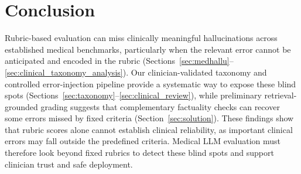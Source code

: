 \documentclass{article}
\begin{document}

\section{Conclusion}

Rubric-based evaluation can miss clinically meaningful hallucinations across established medical benchmarks, particularly when the relevant error cannot be anticipated and encoded in the rubric (Sections~\ref{sec:medhallu}--\ref{sec:clinical_taxonomy_analysis}). Our clinician-validated taxonomy and controlled error-injection pipeline provide a systematic way to expose these blind spots (Sections~\ref{sec:taxonomy}--\ref{sec:clinical_review}), while preliminary retrieval-grounded grading suggests that complementary factuality checks can recover some errors missed by fixed criteria (Section~\ref{sec:solution}). These findings show that rubric scores alone cannot establish clinical reliability, as important clinical errors may fall outside the predefined criteria. Medical LLM evaluation must therefore look beyond fixed rubrics to detect these blind spots and support clinician trust and safe deployment.
\end{document}
